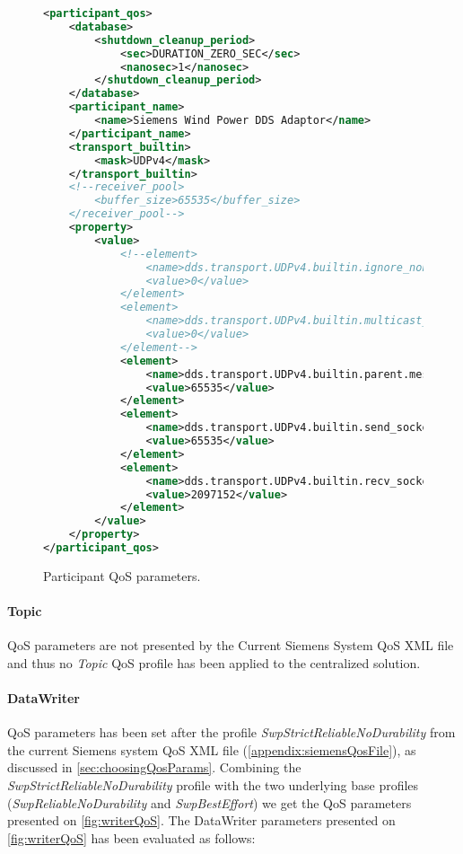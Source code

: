 \begin{figure}
\begin{lstlisting}[language=XML]
<participant_qos>
	<database>
		<shutdown_cleanup_period>
			<sec>DURATION_ZERO_SEC</sec>
			<nanosec>1</nanosec>
		</shutdown_cleanup_period>
	</database>
	<participant_name>
		<name>Siemens Wind Power DDS Adaptor</name>
	</participant_name>
	<transport_builtin>
		<mask>UDPv4</mask>
	</transport_builtin>
	<!--receiver_pool>
		<buffer_size>65535</buffer_size>
	</receiver_pool-->
	<property>
		<value>
			<!--element>
				<name>dds.transport.UDPv4.builtin.ignore_nonup_interfaces</name>
				<value>0</value>
			</element>
			<element>
				<name>dds.transport.UDPv4.builtin.multicast_enabled</name>
				<value>0</value>
			</element-->
			<element>
				<name>dds.transport.UDPv4.builtin.parent.message_size_max</name>
				<value>65535</value>
			</element>
			<element>
				<name>dds.transport.UDPv4.builtin.send_socket_buffer_size</name>
				<value>65535</value>
			</element>
			<element>
				<name>dds.transport.UDPv4.builtin.recv_socket_buffer_size</name>
				<value>2097152</value>
			</element>
		</value>
	</property>
</participant_qos>
\end{lstlisting}
\caption[Participant QoS parameters]{
		\label{fig:parQos} 
		\footnotesize{Participant QoS parameters.}
	}
\end{figure}

\FloatBarrier

\paragraph{Topic} QoS parameters are not presented by the Current Siemens System QoS XML file and thus no \textit{Topic} QoS profile has been applied to the centralized solution. 

\paragraph{DataWriter} QoS parameters has been set after the profile \textit{SwpStrictReliableNoDurability} from the current Siemens system QoS XML file (\cref{appendix:siemensQosFile}), as discussed in \cref{sec:choosingQosParams}. Combining the \textit{SwpStrictReliableNoDurability} profile with the two underlying base profiles (\textit{SwpReliableNoDurability} and \textit{SwpBestEffort}) we get the QoS parameters presented on \cref{fig:writerQoS}. The DataWriter parameters presented on \cref{fig:writerQoS} has been evaluated as follows:

